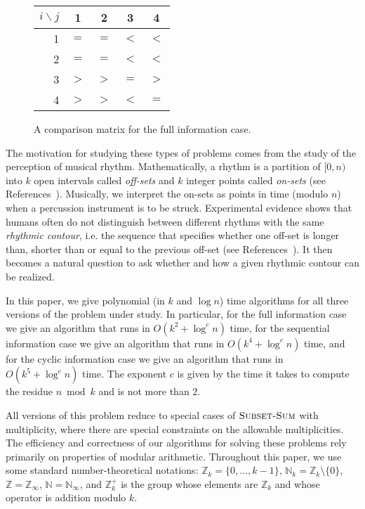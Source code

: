 \documentclass[11pt]{patmorin}
\newcommand{\Z}{\mathbb{Z}}
\newcommand{\N}{\mathbb{N}}
\newcommand{\defeq}{=}
\begin{document}
\begin{figure}
\begin{center}
\begin{tabular}{r|cccc}
$i\backslash j$ & 1 & 2 & 3 & 4 \\ \hline
1 & $=$ & $=$ & $<$ & $<$ \\
2 & $=$ & $=$ & $<$ & $<$ \\
3 & $>$ & $>$ & $=$ & $>$ \\
4 & $>$ & $>$ & $<$ & $=$ \\
\end{tabular}
\end{center}
\caption{A comparison matrix for the full information case.}
\end{figure}

The motivation for studying these types of problems comes from the
study of the perception of musical rhythm.  Mathematically, a rhythm
is a partition  of $[0,n)$ into $k$ open intervals called
\emph{off-sets} and $k$ integer points called \emph{on-sets} (see
References~\cite{dfgrt04,t02,t03a,t03b,t04}).  Musically, we interpret
the on-sets as points in time (modulo $n$) when a percussion
instrument is to be struck.  Experimental evidence shows that humans
often do not distinguish between different rhythms with the same
\emph{rhythmic contour}, i.e.  the sequence that specifies whether one
off-set is longer than, shorter than or equal to the previous off-set
(see References~\cite{d78,ftrkp04,kcgv00,l96}).  It then becomes a
natural question to ask whether and how a given rhythmic contour can
be realized.

In this paper, we give polynomial (in $k$ and $\log n$) time
algorithms for all three versions of the problem under study.  In
particular, for the full information case we give an algorithm that
runs in $O(k^2 + \log^cn)$ time, for the sequential information case
we give an algorithm that runs in $O(k^4+\log^c n)$ time, and for the
cyclic information case we give an algorithm that runs in
$O(k^5+\log^c n)$ time.  The exponent $c$ is given by the time it
takes to compute the residue $n\bmod k$ and is not more than $2$.

All versions of this problem reduce to special cases of
$\textsc{Subset-Sum}$ with multiplicity, where there are special
constraints on the allowable multiplicities.  The efficiency and
correctness of our algorithms for solving these problems rely
primarily on properties of modular arithmetic. Throughout this paper,
we use some standard number-theoretical notations: $\Z_k\defeq
\{0,\ldots,k-1\}$, $\N_k\defeq\Z_k\setminus\{0\}$,
$\Z\defeq\Z_\infty$, $\N\defeq\N_\infty$, and $\Z_k^+$ is the group
whose elements are $\Z_k$ and whose operator is addition modulo $k$.
\end{document}
